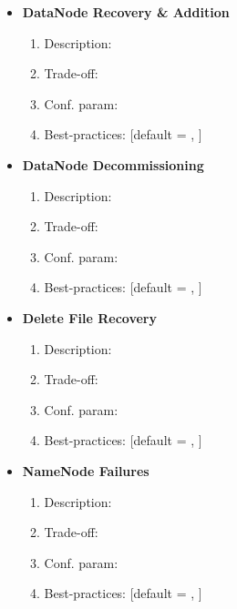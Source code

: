 \begin{itemize}
		\item \textbf{DataNode Recovery \& Addition}
		\begin{enumerate}
			\item Description: 
			\item Trade-off: 
			\item Conf. param: $ $
			\item Best-practices: [default = , ] 
		\end{enumerate}
		\item \textbf{DataNode Decommissioning}
		\begin{enumerate}
			\item Description: 
			\item Trade-off: 
			\item Conf. param: $ $
			\item Best-practices: [default = , ] 
		\end{enumerate}
		\item \textbf{Delete File Recovery}
		\begin{enumerate}
			\item Description: 
			\item Trade-off: 
			\item Conf. param: $ $
			\item Best-practices: [default = , ] 
		\end{enumerate}
		\item \textbf{NameNode Failures}
		\begin{enumerate}
			\item Description: 
			\item Trade-off: 
			\item Conf. param: $ $
			\item Best-practices: [default = , ] 
		\end{enumerate}
	\end{itemize}
